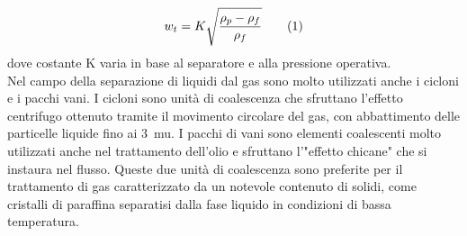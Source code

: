\[ w_t=K \sqrt{\dfrac{\rho_p-\rho_f}{\rho_f}} \addtag \label{eq:rete}\]
dove costante K varia in base al separatore e alla pressione operativa.\\
Nel campo della separazione di liquidi dal gas sono molto utilizzati anche i cicloni e i pacchi vani. I cicloni sono unità di coalescenza che sfruttano l'effetto centrifugo ottenuto tramite il movimento circolare del gas, con abbattimento delle particelle liquide fino ai \SI{3}{mu}. I pacchi di vani sono elementi coalescenti molto utilizzati anche nel trattamento dell'olio e sfruttano l'"effetto chicane" che si instaura nel flusso. Queste due unità di coalescenza sono preferite per il trattamento di gas caratterizzato da un notevole contenuto di solidi, come cristalli di paraffina separatisi dalla fase liquido in condizioni di bassa temperatura.

